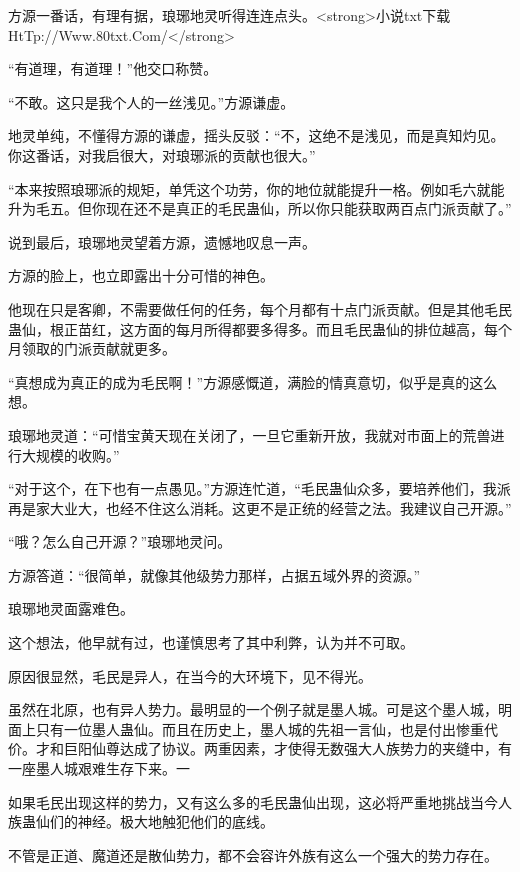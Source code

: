 
\begin{this_body}

方源一番话，有理有据，琅琊地灵听得连连点头。<strong>小说txt下载HtTp://Www.80txt.Com/</strong>

“有道理，有道理！”他交口称赞。

“不敢。这只是我个人的一丝浅见。”方源谦虚。

地灵单纯，不懂得方源的谦虚，摇头反驳：“不，这绝不是浅见，而是真知灼见。你这番话，对我启很大，对琅琊派的贡献也很大。”

“本来按照琅琊派的规矩，单凭这个功劳，你的地位就能提升一格。例如毛六就能升为毛五。但你现在还不是真正的毛民蛊仙，所以你只能获取两百点门派贡献了。”

说到最后，琅琊地灵望着方源，遗憾地叹息一声。

方源的脸上，也立即露出十分可惜的神色。

他现在只是客卿，不需要做任何的任务，每个月都有十点门派贡献。但是其他毛民蛊仙，根正苗红，这方面的每月所得都要多得多。而且毛民蛊仙的排位越高，每个月领取的门派贡献就更多。

“真想成为真正的成为毛民啊！”方源感慨道，满脸的情真意切，似乎是真的这么想。

琅琊地灵道：“可惜宝黄天现在关闭了，一旦它重新开放，我就对市面上的荒兽进行大规模的收购。”

“对于这个，在下也有一点愚见。”方源连忙道，“毛民蛊仙众多，要培养他们，我派再是家大业大，也经不住这么消耗。这更不是正统的经营之法。我建议自己开源。”

“哦？怎么自己开源？”琅琊地灵问。

方源答道：“很简单，就像其他级势力那样，占据五域外界的资源。”

琅琊地灵面露难色。

这个想法，他早就有过，也谨慎思考了其中利弊，认为并不可取。

原因很显然，毛民是异人，在当今的大环境下，见不得光。

虽然在北原，也有异人势力。最明显的一个例子就是墨人城。可是这个墨人城，明面上只有一位墨人蛊仙。而且在历史上，墨人城的先祖一言仙，也是付出惨重代价。才和巨阳仙尊达成了协议。两重因素，才使得无数强大人族势力的夹缝中，有一座墨人城艰难生存下来。一

如果毛民出现这样的势力，又有这么多的毛民蛊仙出现，这必将严重地挑战当今人族蛊仙们的神经。极大地触犯他们的底线。

不管是正道、魔道还是散仙势力，都不会容许外族有这么一个强大的势力存在。


\end{this_body}
